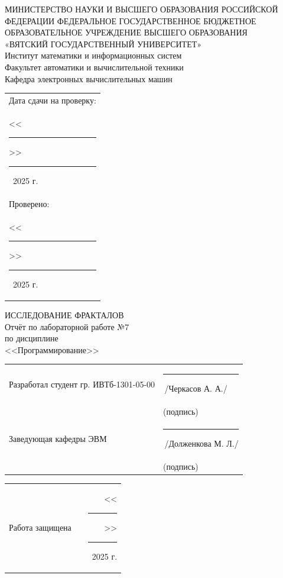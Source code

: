 \documentclass[oneside,a4paper,14pt]{extarticle}
\begin{document}
\newpage
\thispagestyle{empty}
\begin{center}
	МИНИСТЕРСТВО НАУКИ И ВЫСШЕГО ОБРАЗОВАНИЯ РОССИЙСКОЙ ФЕДЕРАЦИИ ФЕДЕРАЛЬНОЕ ГОСУДАРСТВЕННОЕ БЮДЖЕТНОЕ ОБРАЗОВАТЕЛЬНОЕ УЧРЕЖДЕНИЕ ВЫСШЕГО ОБРАЗОВАНИЯ\\
	«ВЯТСКИЙ ГОСУДАРСТВЕННЫЙ УНИВЕРСИТЕТ»\\
	Институт математики и информационных систем\\
	Факультет автоматики и вычислительной техники\\
	Кафедра электронных вычислительных машин
\end{center}
\vspace{10mm}

\hfill
\begin{tabular}{l}
	\footnotesize Дата сдачи на проверку:                                          \\
	\footnotesize <<\rule[-1mm]{5mm}{0.10mm}\/>>\rule[-1mm]{20mm}{0.10mm}\ 2025 г. \\
	\footnotesize Проверено:                                                       \\
	\footnotesize <<\rule[-1mm]{5mm}{0.10mm}\/>>\rule[-1mm]{20mm}{0.10mm}\ 2025 г. \\
\end{tabular}
\vfill

\begin{center}
	ИССЛЕДОВАНИЕ ФРАКТАЛОВ\\
	Отчёт по лабораторной работе №7\\
	по дисциплине\\
	<<Программирование>>\\
\end{center}
\vspace{25mm}
\noindent
\begin{tabular}{ll}
	Разработал студент гр. ИВТб-1301-05-00 & \rule[-1mm]{30mm}{0.10mm}\,/Черкасов А. А./   \\
	                                       & \hspace{8mm}\footnotesize(подпись)            \\
	Заведующая кафедры ЭВМ                 & \rule[-1mm]{30mm}{0.10mm}\,/Долженкова М. Л./ \\
	                                       & \hspace{8mm}\footnotesize(подпись)            \\
\end{tabular}

\noindent
\begin{tabular}{lp{58mm}r}
	Работа защищена &  & <<\rule[-1mm]{5mm}{0.10mm}\/>>\rule[-1mm]{30mm}{0.10mm}\ 2025 г.
\end{tabular}
\vfill
\end{document}
